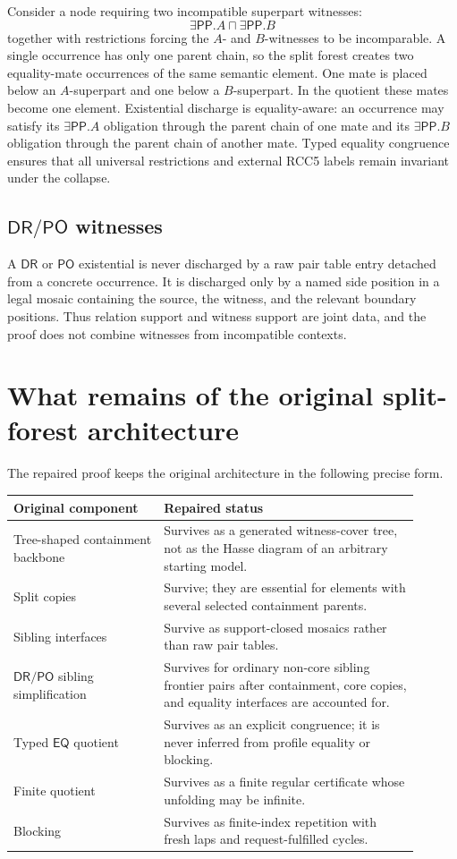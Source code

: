\documentclass[11pt]{article}
\newcommand{\EQ}{\mathsf{EQ}}
\newcommand{\DR}{\mathsf{DR}}
\newcommand{\PO}{\mathsf{PO}}
\newcommand{\PP}{\mathsf{PP}}
\begin{document}
Consider a node requiring two incompatible superpart witnesses:
\[
  \exists\PP.A\sqcap\exists\PP.B
\]
together with restrictions forcing the $A$- and $B$-witnesses to be incomparable.  A single occurrence has only one parent chain, so the split forest creates two equality-mate occurrences of the same semantic element.  One mate is placed below an $A$-superpart and one below a $B$-superpart.  In the quotient these mates become one element.  Existential discharge is equality-aware: an occurrence may satisfy its $\exists\PP.A$ obligation through the parent chain of one mate and its $\exists\PP.B$ obligation through the parent chain of another mate.  Typed equality congruence ensures that all universal restrictions and external RCC5 labels remain invariant under the collapse.

\subsection{$\DR/\PO$ witnesses}

A $\DR$ or $\PO$ existential is never discharged by a raw pair table entry detached from a concrete occurrence.  It is discharged only by a named side position in a legal mosaic containing the source, the witness, and the relevant boundary positions.  Thus relation support and witness support are joint data, and the proof does not combine witnesses from incompatible contexts.

\section{What remains of the original split-forest architecture}

The repaired proof keeps the original architecture in the following precise form.
\begin{center}
\begin{tabular}{p{0.33\linewidth}p{0.57\linewidth}}
\toprule
Original component & Repaired status \\
\midrule
Tree-shaped containment backbone & Survives as a generated witness-cover tree, not as the Hasse diagram of an arbitrary starting model. \\
Split copies & Survive; they are essential for elements with several selected containment parents. \\
Sibling interfaces & Survive as support-closed mosaics rather than raw pair tables. \\
$\DR/\PO$ sibling simplification & Survives for ordinary non-core sibling frontier pairs after containment, core copies, and equality interfaces are accounted for. \\
Typed $\EQ$ quotient & Survives as an explicit congruence; it is never inferred from profile equality or blocking. \\
Finite quotient & Survives as a finite regular certificate whose unfolding may be infinite. \\
Blocking & Survives as finite-index repetition with fresh laps and request-fulfilled cycles. \\
\bottomrule
\end{tabular}
\end{center}
\end{document}
